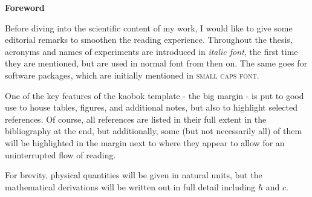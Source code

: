 
\thispagestyle{plain}
\begin{minipage}[c][0.4\textheight][b]{0.9\textwidth}
    
    \huge
    \textbf{Foreword}
    \normalsize
    \par
    \vspace{1.0cm}
    Before diving into the scientific content of my work, I would like to give some editorial remarks to smoothen the reading experience. Throughout the thesis, acronyms and names of experiments are introduced in \textit{italic font}, the first time they are mentioned, but are used in normal font from then on. The same goes for software packages, which are initially mentioned in \textsc{small caps font}.
    
    \par
    \vspace{0.2cm}
    
    One of the key features of the kaobok template - the big margin - is put to good use to house tables, figures, and additional notes, but also to highlight selected references. Of course, all references are listed in their full extent in the bibliography at the end, but additionally, some (but not necessarily all) of them will be highlighted in the margin next to where they appear to allow for an uninterrupted flow of reading.
    
    \par
    \vspace{0.2cm}
    
    For brevity, physical quantities will be given in natural units, but the mathematical derivations will be written out in full detail including $\hbar$ and $c$.

\end{minipage}
